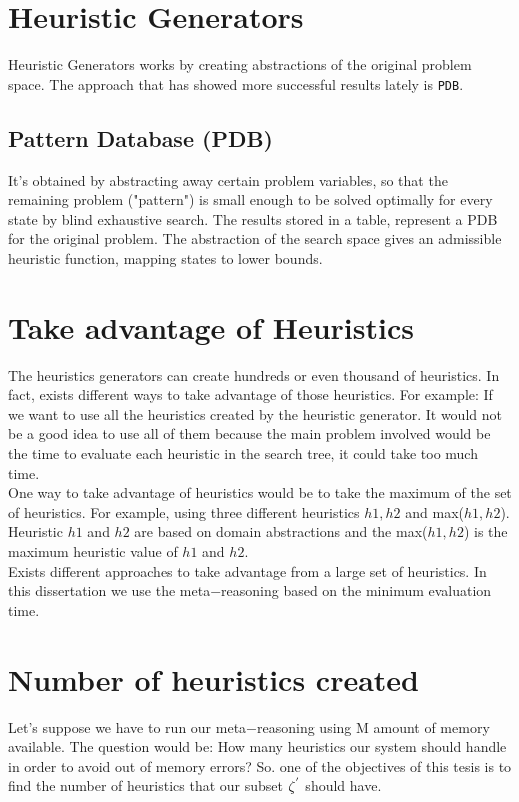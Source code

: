 \section{Heuristic Generators}
Heuristic Generators works by creating abstractions of the original problem space. The approach that has showed more successful results lately is \texttt{PDB}.

\subsection{Pattern Database (PDB)}
It's obtained by abstracting away certain problem variables, so that the remaining problem ("pattern") is small enough to be solved optimally for every state by blind exhaustive search. The results stored in a table, represent a PDB for the original problem. The abstraction of the search space gives an admissible heuristic function, mapping states to lower bounds.

\section{Take advantage of Heuristics}
The heuristics generators can create hundreds or even thousand of heuristics. In fact, exists different ways to take advantage of those heuristics. For example: If we want to use all the heuristics created by the heuristic generator. It would not be a good idea to use all of them because the main problem involved would be the time to evaluate each heuristic in the search tree, it could take too much time. \\

One way to take advantage of heuristics would be to take the maximum of the set of heuristics. For example, using three different heuristics $h1, h2$ and max($h1, h2$). Heuristic $h1$ and $h2$ are based on domain abstractions and the max($h1, h2$) is the maximum heuristic value of $h1$ and $h2$. \\

Exists different approaches to take advantage from a large set of heuristics. In this dissertation we use the meta$-$reasoning based on the minimum evaluation time. \\


\section{Number of heuristics created}
Let's suppose we have to run our meta$-$reasoning using M amount of memory available. The question would be: How many heuristics our system should handle in order to avoid out of memory errors? So. one of the objectives of this tesis is to find the number of heuristics that our subset $\zeta\sp{'}$ should have.

